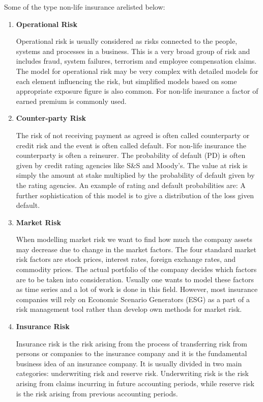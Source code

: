\par
Some of the type non-life insurance arelisted below:\cite{grevskott_2011}
\begin{enumerate}


\item \textbf{Operational Risk}
\par
Operational risk is usually considered as risks connected to the people, systems and processes in a business. This is a very broad group of risk and includes fraud, system failures, terrorism and employee compensation claims. The model for operational risk may be very complex with detailed models for each element influencing the risk, but simplified models based on some appropriate exposure figure is also common. For non-life insurance a factor of earned premium is commonly used.
\par
\item \textbf{Counter-party Risk}
\par
The risk of not receiving payment as agreed is often called counterparty or credit risk and the event is often called default. For non-life insurance the counterparty is often a reinsurer. The probability of default (PD) is often given by credit rating agencies like S\&S  and Moody’s. The value at risk is simply the amount at stake multiplied by the probability of default given by the rating agencies. An example of rating and default probabilities are: A further sophistication of this model is to give a distribution of the loss given default.
\par
\item \textbf{Market Risk}
\par
When modelling market risk we want to find how much the company assets may decrease due to change in the market factors. The four standard market risk factors are stock prices, interest rates, foreign exchange rates, and commodity prices. The actual portfolio of the company decides which factors are to be taken into consideration. Usually one wants to model these factors as time series and a lot of work is done in this field. However, most insurance companies will rely on Economic Scenario Generators (ESG) as a part of a risk management tool rather than develop own methods for market risk.


\item \textbf{Insurance Risk}
\par
Insurance risk is the risk arising from the process of transferring risk from persons or companies to the insurance company and it is the fundamental business idea of an insurance company. It is usually divided in two main categories: underwriting risk and reserve risk. Underwriting risk is the risk arising from claims incurring in future accounting periods, while reserve risk is the risk arising from previous accounting periods.


\end{enumerate}
